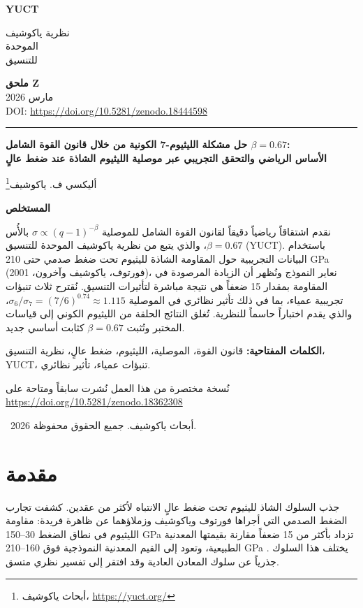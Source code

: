 \documentclass[12pt,a4paper]{article}
\theoremstyle{remark}
\newcommand{\makeheader}{%
	\noindent
	\begin{minipage}{0.17\textwidth}
		\raggedright
		{\sffamily\bfseries\color{skyblue}\fontsize{46}{46}\selectfont YUCT}%
	\end{minipage}%
	\hspace{30pt}
	\begin{minipage}{0.32\textwidth}
		\raggedright
		{\sffamily\fontsize{11}{13}\selectfont نظرية ياكوشيف\\ الموحدة\\ للتنسيق}%
	\end{minipage}%
	\hfill
	\begin{minipage}{0.38\textwidth}
		\raggedleft
		{\sffamily\bfseries ملحق Z}\\
		{\sffamily مارس 2026}\\
		{\sffamily\footnotesize \scriptsize DOI: \url{https://doi.org/10.5281/zenodo.18444598}}%
	\end{minipage}
	\par\vspace{5pt}
	\noindent\textcolor{gold}{\rule{\textwidth}{1.6pt}}
	\par\vspace{0pt}
}
\begin{document}
	\thispagestyle{firstpage}
	\makeheader
	
	\vspace{0cm}
	{\LARGE\bfseries حل مشكلة الليثيوم-7 الكونية من خلال قانون القوة الشامل \(\beta = 0.67\): \\
		الأساس الرياضي والتحقق التجريبي عبر موصلية الليثيوم الشاذة عند ضغط عالٍ \par}
	\vspace{0.2cm}
	
	{\large أليكسي ف. ياكوشيف\footnote{أبحاث ياكوشيف، \url{https://yuct.org/}}} \\
	\vspace{0.0cm}
	
	{\color{darkblue}\textbf{\LARGE المستخلص}} \par
	{\large
		\noindent
		نقدم اشتقاقاً رياضياً دقيقاً لقانون القوة الشامل للموصلية \(\sigma \propto (q-1)^{-\beta}\) بالأُس \(\beta = 0.67\)، والذي يتبع من نظرية ياكوشيف الموحدة للتنسيق (YUCT). باستخدام البيانات التجريبية حول المقاومة الشاذة لليثيوم تحت ضغط صدمي حتى 210 GPa (فورتوف، ياكوشيف وآخرون، 2001)، نعاير النموذج ونُظهر أن الزيادة المرصودة في المقاومة بمقدار 15 ضعفاً هي نتيجة مباشرة لتأثيرات التنسيق. نُقترح ثلاث تنبؤات تجريبية عمياء، بما في ذلك تأثير نظائري في الموصلية \(\sigma_6/\sigma_7 = (7/6)^{0.74} \approx 1.115\)، والذي يقدم اختباراً حاسماً للنظرية. تُغلق النتائج الحلقة من الليثيوم الكوني إلى قياسات المختبر وتُثبت \(\beta = 0.67\) كثابت أساسي جديد.
	}
	
	\vspace{0.1cm}
	\noindent
	{\color{darkblue}\textbf{الكلمات المفتاحية:}} قانون القوة، الموصلية، الليثيوم، ضغط عالٍ، نظرية التنسيق، YUCT، تنبؤات عمياء، تأثير نظائري.
	
	\vspace{0.5cm}
	\noindent
	{\small نُسخة مختصرة من هذا العمل نُشرت سابقاً ومتاحة على \\ \url{https://doi.org/10.5281/zenodo.18362308}}
	\vspace{0.5cm}
	
	\noindent
	\textcopyright\ 2026 أبحاث ياكوشيف. جميع الحقوق محفوظة.
	
	\tableofcontents
	\newpage
	
	\section{مقدمة}
	\label{sec:intro}
	
	جذب السلوك الشاذ لليثيوم تحت ضغط عالٍ الانتباه لأكثر من عقدين. كشفت تجارب الضغط الصدمي التي أجراها فورتوف وياكوشيف وزملاؤهما \cite{fortov2001, yakushev2002, fortov1999} عن ظاهرة فريدة: مقاومة الليثيوم في نطاق الضغط 30–150 GPa تزداد بأكثر من 15 ضعفاً مقارنة بقيمتها المعدنية الطبيعية، وتعود إلى القيم المعدنية النموذجية فوق 160–210 GPa \cite{fortov2001, yakushev2002}. يختلف هذا السلوك جذرياً عن سلوك المعادن العادية وقد افتقر إلى تفسير نظري متسق.
	
\end{document}
